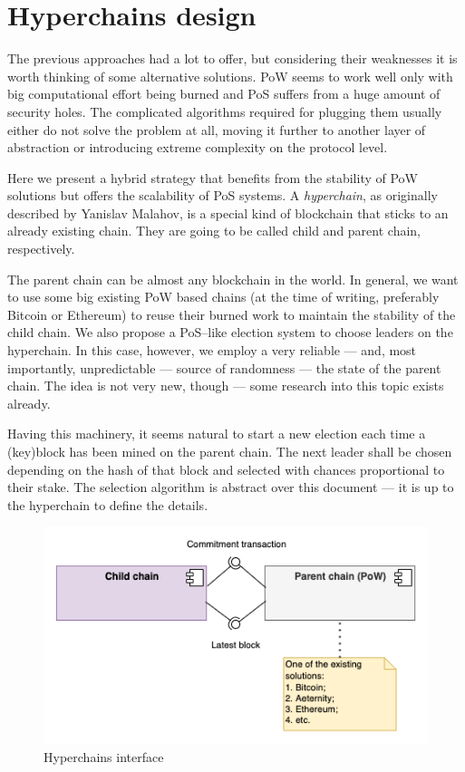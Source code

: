 \section{Hyperchains design}
\graphicspath{ {./images/} }

The previous approaches had a lot to offer, but considering their weaknesses it
is worth thinking of some alternative solutions. PoW seems to work well only
with big computational effort being burned and PoS suffers from a huge amount of
security holes. The complicated algorithms required for plugging them usually
either do not solve the problem at all, moving it further to another layer of
abstraction or introducing extreme complexity on the protocol level.

Here we present a hybrid strategy that benefits from the stability of PoW
solutions but offers the scalability of PoS systems. A \emph{hyperchain}, as
originally described by Yanislav Malahov\cite{hyperchains}, is a special kind of
blockchain that sticks to an already existing chain. They are going to be called
child and parent chain, respectively.

The parent chain can be almost any blockchain in the world. In general, we want
to use some big existing PoW based chains (at the time of writing, preferably
Bitcoin or Ethereum) to reuse their burned work to maintain the stability of the
child chain. We also propose a PoS–like election system to choose leaders on the
hyperchain. In this case, however, we employ a very reliable — and, most
importantly, unpredictable — source of randomness — the state of the parent
chain. The idea is not very new, though — some research into this topic exists
already\cite{blockchain_random}.

Having this machinery, it seems natural to start a new election each time a
(key)block has been mined on the parent chain. The next leader shall be chosen
depending on the hash of that block and selected with chances proportional to
their stake. The selection algorithm is abstract over this document — it is up
to the hyperchain to define the details.

\begin{figure}[b]
     \caption{Hyperchains interface}
     \centering
     \includegraphics[scale=0.5]{hyperchains_interface}
\end{figure}

